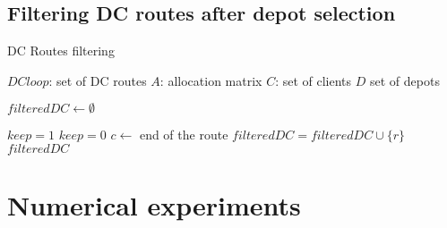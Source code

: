 \documentclass[a4paper,10pt]{article}
\begin{document}
\begin{linenumbers}
\subsection{Filtering DC routes after depot selection}

\begin{algorithm}
	\caption{DC Routes filtering}
	\label{algo:filteringDC}
	\begin{algorithmic}[1]
		\REQUIRE $DCloop$: set of DC routes
		\REQUIRE $A$: allocation matrix
		\REQUIRE $C$: set of clients
		\REQUIRE $D$ set of depots
		
		\STATE $filteredDC \leftarrow \emptyset$
				
			\STATE $keep = 1$
					\STATE $keep=0$
					\STATE $c \leftarrow $ end of the route
				\ENDIF
			\ENDFOR  
				\STATE $filteredDC =filteredDC \cup \{r \}$
			\ENDIF
		\ENDFOR
		\RETURN $filtered DC$
	\end{algorithmic}
\end{algorithm}





\section{Numerical experiments}
\label{sec:expe}


\end{linenumbers}
\end{document}
